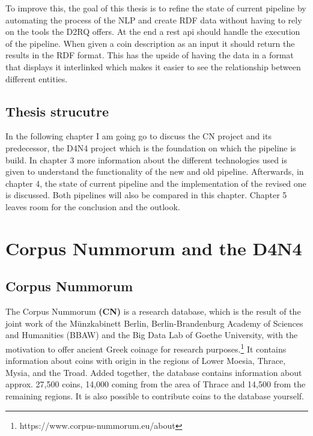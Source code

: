 \documentclass[12pt, oneside]{article}
\begin{document}
To improve this, the goal of this thesis is to refine the state of current pipeline by automating the process of the NLP and create RDF data without having to rely on the tools the D2RQ offers. At the end a rest api should handle the execution of the pipeline. When  given a coin description as an input it should return the results in the RDF format. This has the upside of having the data in a format that displays it interlinked which makes it easier to see the relationship between different entities.
\subsection{Thesis strucutre}
In the following chapter I am going go to discuss the CN project and its predecessor, the D4N4 project which is the foundation on which the pipeline is build. In chapter 3 more information about the different technologies used is given to understand the functionality of the new and old pipeline. Afterwards, in chapter 4, the state of current pipeline and the implementation of the revised one is discussed. Both pipelines will also be compared in this chapter. Chapter 5 leaves room for the conclusion and the outlook.
\newpage
\section{Corpus Nummorum and the D4N4} \label{cn}
\subsection{Corpus Nummorum}
The Corpus Nummorum \textbf{(CN)} is a  research database, which is  the result of the joint work of the Münzkabinett Berlin, Berlin-Brandenburg Academy of Sciences and Humanities (BBAW) and the Big Data Lab of Goethe University, with the motivation to offer ancient Greek coinage for research purposes.\footnote{https://www.corpus-nummorum.eu/about}
It contains information about coins with origin in the regions of Lower Moesia, Thrace, Mysia, and the Troad. Added together, the database contains information about approx. 27,500 coins, 14,000 coming from the area of Thrace and 14,500 from the remaining regions. It is also possible to contribute coins to the database yourself.
\end{document}
